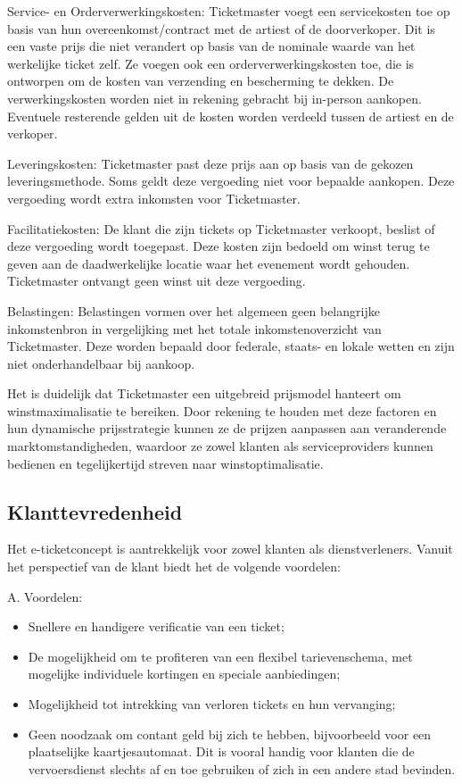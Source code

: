 Service- en Orderverwerkingskosten: Ticketmaster voegt een servicekosten toe op basis van hun overeenkomst/contract met de artiest of de doorverkoper. Dit is een vaste prijs die niet verandert op basis van de nominale waarde van het werkelijke ticket zelf. Ze voegen ook een orderverwerkingskosten toe, die is ontworpen om de kosten van verzending en bescherming te dekken. De verwerkingskosten worden niet in rekening gebracht bij in-person aankopen. Eventuele resterende gelden uit de kosten worden verdeeld tussen de artiest en de verkoper.

Leveringskosten: Ticketmaster past deze prijs aan op basis van de gekozen leveringsmethode. Soms geldt deze vergoeding niet voor bepaalde aankopen. Deze vergoeding wordt extra inkomsten voor Ticketmaster.

Facilitatiekosten: De klant die zijn tickets op Ticketmaster verkoopt, beslist of deze vergoeding wordt toegepast. Deze kosten zijn bedoeld om winst terug te geven aan de daadwerkelijke locatie waar het evenement wordt gehouden. Ticketmaster ontvangt geen winst uit deze vergoeding.

Belastingen: Belastingen vormen over het algemeen geen belangrijke inkomstenbron in vergelijking met het totale inkomstenoverzicht van Ticketmaster. Deze worden bepaald door federale, staats- en lokale wetten en zijn niet onderhandelbaar bij aankoop.

\vspace{5 mm}

Het is duidelijk dat Ticketmaster een uitgebreid prijsmodel hanteert om winstmaximalisatie te bereiken. Door rekening te houden met deze factoren en hun dynamische prijsstrategie kunnen ze de prijzen aanpassen aan veranderende marktomstandigheden, waardoor ze zowel klanten als serviceproviders kunnen bedienen en tegelijkertijd streven naar winstoptimalisatie.

\newpage
\subsection{Klanttevredenheid}

Het e-ticketconcept is aantrekkelijk voor zowel klanten als dienstverleners. Vanuit het perspectief van de klant biedt het de volgende voordelen:
\vspace{5 mm}

A. Voordelen:
\begin{itemize}
    \item Snellere en handigere verificatie van een ticket;
    \item De mogelijkheid om te profiteren van een flexibel tarievenschema, met mogelijke individuele kortingen en speciale aanbiedingen;
    \item Mogelijkheid tot intrekking van verloren tickets en hun vervanging;
    \item Geen noodzaak om contant geld bij zich te hebben, bijvoorbeeld voor een plaatselijke kaartjesautomaat. Dit is vooral handig voor klanten die de vervoersdienst slechts af en toe gebruiken of zich in een andere stad bevinden.
\end{itemize}
\vspace{5 mm}

